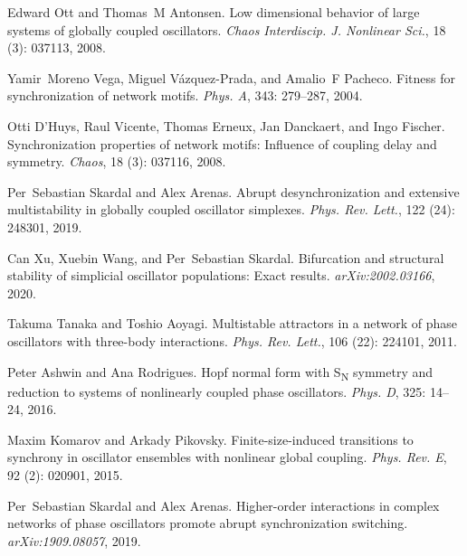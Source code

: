 Edward Ott and Thomas~M Antonsen.
\newblock Low dimensional behavior of large systems of globally coupled
oscillators.
\newblock \emph{Chaos Interdiscip. J. Nonlinear Sci.}, 18
(3): 037113, 2008.

Yamir~Moreno Vega, Miguel {V{\'a}zquez-Prada}, and Amalio~F Pacheco.
\newblock Fitness for synchronization of network motifs.
\newblock \emph{Phys. A}, 343: 279--287, 2004.

Otti D'Huys, Raul Vicente, Thomas Erneux, Jan Danckaert, and Ingo Fischer.
\newblock Synchronization properties of network motifs: {{Influence}} of
coupling delay and symmetry.
\newblock \emph{Chaos}, 18 (3): 037116, 2008.

Per~Sebastian Skardal and Alex Arenas.
\newblock Abrupt desynchronization and extensive multistability in globally
coupled oscillator simplexes.
\newblock \emph{Phys. Rev. Lett.}, 122 (24): 248301,
2019{}.

Can Xu, Xuebin Wang, and Per~Sebastian Skardal.
\newblock Bifurcation and structural stability of simplicial oscillator
populations: {{Exact}} results.
\newblock \emph{arXiv:2002.03166}, 2020.

Takuma Tanaka and Toshio Aoyagi.
\newblock Multistable attractors in a network of phase oscillators with
three-body interactions.
\newblock \emph{Phys. Rev. Lett.}, 106 (22): 224101, 2011.

Peter Ashwin and Ana Rodrigues.
\newblock Hopf normal form with {{S{\textsubscript{N}}}} symmetry and reduction
to systems of nonlinearly coupled phase oscillators.
\newblock \emph{Phys. D}, 325: 14--24, 2016.

Maxim Komarov and Arkady Pikovsky.
\newblock Finite-size-induced transitions to synchrony in oscillator ensembles
with nonlinear global coupling.
\newblock \emph{Phys. Rev. E}, 92 (2): 020901, 2015.

Per~Sebastian Skardal and Alex Arenas.
\newblock Higher-order interactions in complex networks of phase oscillators
promote abrupt synchronization switching.
\newblock \emph{arXiv:1909.08057}, 2019{}.

